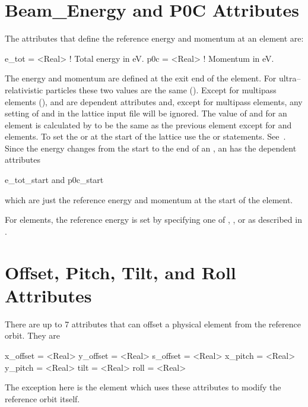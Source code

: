 \section{Beam_Energy and P0C Attributes}
\label{s:energy}
The attributes that define the reference energy and momentum at an element are:
\begin{example}
  e_tot  = <Real>  ! Total energy in eV.
  p0c    = <Real>  ! Momentum in eV.
\end{example}
The energy and momentum are defined at the exit end of the element.
For ultra--relativistic particles these two values are the same
(). Except for multipass elements
(),  and  are dependent attributes
and, except for multipass elements, any setting of  and
 in the lattice input file will be ignored. The value of
 and  for an element is calculated by \bmad to be
the same as the previous element except for  and
 elements. To set the  or  at the start of
the lattice use the  or  statements.
See~. Since the energy changes from the start to the end
of an , an  has the dependent attributes
\begin{example}
  e_tot_start   and
  p0c_start
\end{example}
which are just the reference energy and momentum at the start of the element.

For  elements, the reference energy is set by specifying
one of , , or  as described in
.

\section{Offset, Pitch, Tilt, and Roll Attributes}
\label{s:offset}

There are up to 7 attributes that can offset a physical element
from the reference orbit. They are
\begin{example}
  x_offset = <Real>
  y_offset = <Real>
  s_offset = <Real>
  x_pitch  = <Real>
  y_pitch  = <Real>
  tilt     = <Real>
  roll     = <Real>
\end{example}
The exception here is the  element which uses these
attributes to modify the reference orbit itself.

